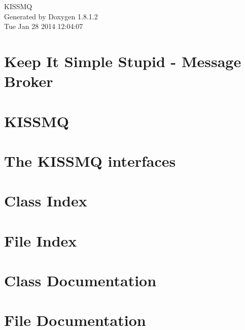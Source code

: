 \documentclass{book}
\begin{document}
\hypersetup{pageanchor=false,citecolor=blue}
\begin{titlepage}
\vspace*{7cm}
\begin{center}
{\Large K\-I\-S\-S\-M\-Q }\\
\vspace*{1cm}
{\large Generated by Doxygen 1.8.1.2}\\
\vspace*{0.5cm}
{\small Tue Jan 28 2014 12:04:07}\\
\end{center}
\end{titlepage}
\clearemptydoublepage
{}
\tableofcontents
\clearemptydoublepage
{}
\hypersetup{pageanchor=true,citecolor=blue}
\chapter{Keep It Simple Stupid -\/ Message Broker}
\label{index}\hypertarget{index}{}
\chapter{K\-I\-S\-S\-M\-Q}
\label{md_README}
\hypertarget{md_README}{}

\chapter{The K\-I\-S\-S\-M\-Q interfaces}
\label{md_the_kissmq_interfaces}
\hypertarget{md_the_kissmq_interfaces}{}

\chapter{Class Index}

\chapter{File Index}

\chapter{Class Documentation}



\chapter{File Documentation}











\printindex
\end{document}
